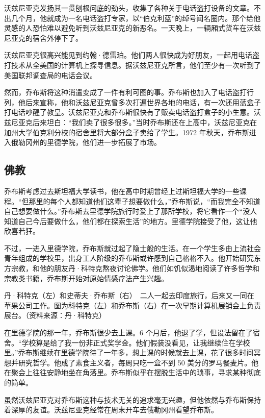 \documentclass[12pt,UTF8]{ctexbook}
\begin{document}
沃兹尼亚克发扬其一贯刨根问底的劲头，收集了各种关于电话盗打设备的文章。不出几个月，他就成为一名电话盗打专家，以“伯克利蓝”的绰号闻名圈内。那个给他灵感的人恐怕难以避免听到沃兹尼亚克的新恶名。一天晚上，一辆厢式货车在沃兹尼亚克的宿舍外停下了。

沃兹尼亚克很高兴能见到约翰·德雷珀。他们两人很快成为好朋友，一起用电话盗打技术从全美国的计算机上探寻信息。据沃兹尼亚克所言，他们至少有一次听到了美国联邦调查局的电话会议。

然而，乔布斯将这种消遣变成了一件有利可图的事。乔布斯也加入了电话盗打行列，他后来宣称，他和沃兹尼亚克曾多次打遍世界各地的电话，有一次还用蓝盒子打电话吵醒了教皇。沃兹尼亚克和乔布斯很快有了贩卖电话盗打盒子的小生意。沃兹尼亚克后来坦白：“我们卖了很多很多。”当时乔布斯还在上高中，沃兹尼亚克在加州大学伯克利分校的宿舍里将大部分盒子卖给了学生。1972 年秋天，乔布斯进入俄勒冈州的里德学院，他们进一步拓展了市场。





\subsection{佛教}


乔布斯考虑过去斯坦福大学读书，他在高中时期曾经上过斯坦福大学的一些课程。“但那里的每个人都知道他们这辈子想要做什么，”乔布斯说，“而我完全不知道自己想要做什么。”乔布斯去里德学院旅行时爱上了那所学校，将它看作一个“没人知道自己今后要做什么，他们都在探索生活”的地方。里德学院接受了他，这让他欣喜若狂。

不过，一进入里德学院，乔布斯就过起了隐士般的生活。在一个学生多由上流社会青年组成的学校里，出身工人阶级的乔布斯或许感到自己格格不入。他开始研究东方宗教，和他的朋友丹·科特克熬夜讨论佛学。他们如饥似渴地阅读了许多哲学和宗教类书籍，乔布斯开始对原始情感疗法产生兴趣。



丹·科特克（左）和史蒂夫·乔布斯（右）　二人一起去印度旅行，后来又一同在苹果公司工作。图为科特克（左）和乔布斯（右）在一次早期计算机展销会上负责展台。（资料来源：丹·科特克）

在里德学院的那一年，乔布斯很少去上课。6 个月后，他退了学，但设法留在了宿舍。“学校算是给了我一份非正式奖学金。他们假装没看见，让我继续住在学校里。”乔布斯继续在里德学院待了一年多，想上课的时候就去上课，花了很多时间冥想并研究哲学。他成了素食主义者，每周只吃一盒不到 50 美分的罗马餐麦片。他在聚会上往往安静地坐在角落里。乔布斯似乎在摆脱生活中的琐事，寻求某种彻底的简单。

虽然沃兹尼亚克对乔布斯这种与技术无关的追求毫无兴趣，但他依然与乔布斯保持着深厚的友谊。沃兹尼亚克经常在周末开车去俄勒冈州看望乔布斯。
\end{document}
